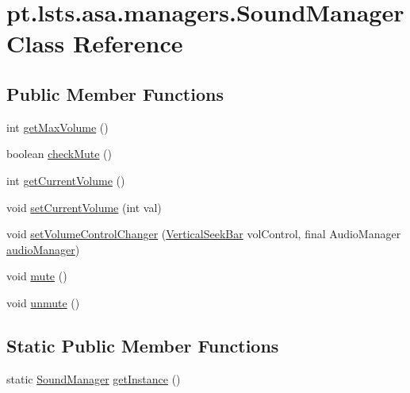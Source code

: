 \hypertarget{classpt_1_1lsts_1_1asa_1_1managers_1_1SoundManager}{}\section{pt.\+lsts.\+asa.\+managers.\+Sound\+Manager Class Reference}
\label{classpt_1_1lsts_1_1asa_1_1managers_1_1SoundManager}
\subsection*{Public Member Functions}
\begin{DoxyCompactItemize}
\item 
int \hyperlink{classpt_1_1lsts_1_1asa_1_1managers_1_1SoundManager_ab837cf032463483d61ec5d84b37c5695}{get\+Max\+Volume} ()
\item 
boolean \hyperlink{classpt_1_1lsts_1_1asa_1_1managers_1_1SoundManager_aaeedcf7a2b659ab29d230812684850f6}{check\+Mute} ()
\item 
int \hyperlink{classpt_1_1lsts_1_1asa_1_1managers_1_1SoundManager_acae2438da2be39fd6a744e3e925f1ef1}{get\+Current\+Volume} ()
\item 
void \hyperlink{classpt_1_1lsts_1_1asa_1_1managers_1_1SoundManager_a5885bb6c5d6918979b1bfdf87eaed657}{set\+Current\+Volume} (int val)
\item 
void \hyperlink{classpt_1_1lsts_1_1asa_1_1managers_1_1SoundManager_a445d21262e3d9c5a0585ebfc9b3894a5}{set\+Volume\+Control\+Changer} (\hyperlink{classpt_1_1lsts_1_1asa_1_1ui_1_1components_1_1VerticalSeekBar}{Vertical\+Seek\+Bar} vol\+Control, final Audio\+Manager \hyperlink{classpt_1_1lsts_1_1asa_1_1managers_1_1SoundManager_adb83fab9065c3c13209bff3a97f19b06}{audio\+Manager})
\item 
void \hyperlink{classpt_1_1lsts_1_1asa_1_1managers_1_1SoundManager_a27db8676b032c2f1a1f860e6a37ace38}{mute} ()
\item 
void \hyperlink{classpt_1_1lsts_1_1asa_1_1managers_1_1SoundManager_ae1c94368fcbee210aecd334b329df815}{unmute} ()
\end{DoxyCompactItemize}
\subsection*{Static Public Member Functions}
\begin{DoxyCompactItemize}
\item 
static \hyperlink{classpt_1_1lsts_1_1asa_1_1managers_1_1SoundManager}{Sound\+Manager} \hyperlink{classpt_1_1lsts_1_1asa_1_1managers_1_1SoundManager_ad6c4e83c02bcde903bd15c24a0e50b79}{get\+Instance} ()
\end{DoxyCompactItemize}
